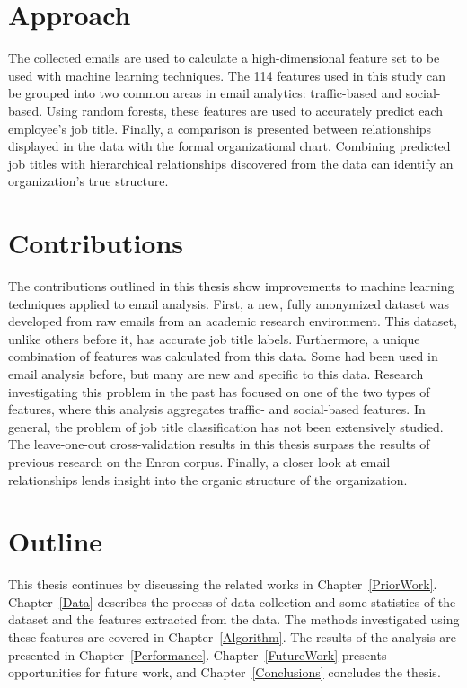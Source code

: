 \documentclass[12pt]{report}
\begin{document}
\section{Approach}
The collected emails are used to calculate a high-dimensional feature set to be used with machine learning techniques.
The 114 features used in this study can be grouped into two common areas in email analytics: traffic-based and social-based.
Using random forests, these features are used to accurately predict each employee's job title.
Finally, a comparison is presented between relationships displayed in the data with the formal organizational chart.
Combining predicted job titles with hierarchical relationships discovered from the data can identify an organization's true structure.

\section{Contributions}
The contributions outlined in this thesis show improvements to machine learning techniques applied to email analysis.  
First, a new, fully anonymized dataset was developed from raw emails from an academic research environment.  
This dataset, unlike others before it, has accurate job title labels.  
Furthermore, a unique combination of features was calculated from this data.  
Some had been used in email analysis before, but many are new and specific to this data.
Research investigating this problem in the past has focused on one of the two types of features, where this analysis aggregates traffic- and social-based features.
In general, the problem of job title classification has not been extensively studied.  
The leave-one-out cross-validation results in this thesis surpass the results of previous research on the Enron corpus.
Finally, a closer look at email relationships lends insight into the organic structure of the organization.


\section{Outline}
This thesis continues by discussing the related works in Chapter~\ref{PriorWork}.  
Chapter~\ref{Data} describes the process of data collection and some statistics of the dataset and the features extracted from the data.
The methods investigated using these features are covered in Chapter~\ref{Algorithm}.
The results of the analysis are presented in Chapter~\ref{Performance}.
 Chapter~\ref{FutureWork} presents opportunities for future work, and Chapter~\ref{Conclusions} concludes the thesis.
\end{document}
